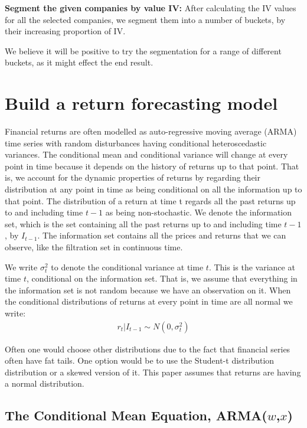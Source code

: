 \textbf{Segment the given companies by value IV:} After calculating the IV values for all the selected companies, we segment them into a number of buckets, by their increasing proportion of IV. 

We believe it will be positive to try the segmentation for a range of different buckets, as it might effect the end result.

\section*{Build a return forecasting model} 

Financial returns are often modelled as auto-regressive moving average (ARMA) time series with random disturbances having conditional heteroscedastic variances. The conditional mean and conditional variance will change at every point in time because it depends on the history of returns up to that point. That is, we account for the dynamic properties of returns by regarding their distribution at any point in time as being conditional on all the information up to that point. The distribution of a return at time t regards all the past returns up to and including time $t-1$ as being non-stochastic. We denote the information set, which is the set containing all the past returns up to and including time $t-1$, by $I_{t-1}$. The information set contains all the prices and returns that we can observe, like the filtration set in continuous time. 

We write $\sigma_t^2$ to denote the conditional variance at time $t$. This is the variance at time $t$, conditional on the information set. That is, we assume that everything in the information set is not random because we have an observation on it. When the conditional distributions of returns at every point in time are all normal we write:
\begin{align}
    r_t | I_{t-1} \sim N(0,{\sigma_t^2})
\end{align}

Often one would choose other distributions due to the fact that financial
series often have fat tails. One option would be to use the Student-t
distribution distribution or a skewed version of it. This paper assumes that returns are having a normal distribution. 

\subsection*{The Conditional Mean Equation, ARMA($w$,$x$)}


